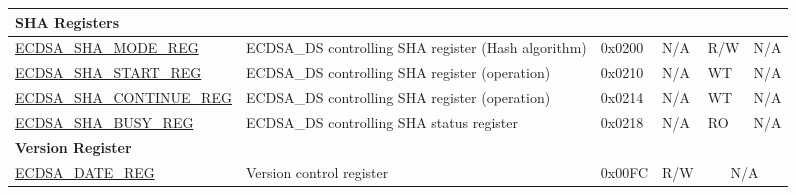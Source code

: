 \begin{longtable}{ | p{4.8cm} | l | p{1.3cm} | l | l | l | l | }
\multicolumn{7}{|l|}{\textbf{SHA Registers}} \\ \hline
\hyperref[regdesc:ECDSASHAMODEREG]{ECDSA\_SHA\_MODE\_REG} & ECDSA\_DS controlling SHA register (Hash algorithm) & 0x0200 & N/A & R/W & \multicolumn{2}{|c|}{N/A} \\ \hline
\hyperref[regdesc:ECDSASHASTARTREG]{ECDSA\_SHA\_START\_REG} & ECDSA\_DS controlling SHA register (operation) & 0x0210 & N/A & WT & \multicolumn{2}{|c|}{N/A} \\ \hline
\hyperref[regdesc:ECDSASHACONTINUEREG]{ECDSA\_SHA\_CONTINUE\_REG} & ECDSA\_DS controlling SHA register (operation) & 0x0214 & N/A & WT & \multicolumn{2}{|c|}{N/A} \\ \hline
\hyperref[regdesc:ECDSASHABUSYREG]{ECDSA\_SHA\_BUSY\_REG} & ECDSA\_DS controlling SHA status register & 0x0218 & N/A & RO & \multicolumn{2}{|c|}{N/A} \\ \hline
\multicolumn{7}{|l|}{\textbf{Version Register}} \\ \hline
\hyperref[regdesc:ECDSADATEREG]{ECDSA\_DATE\_REG} & Version control register & 0x00FC & R/W & \multicolumn{3}{|c|}{N/A} \\ \hline
\end{longtable}
